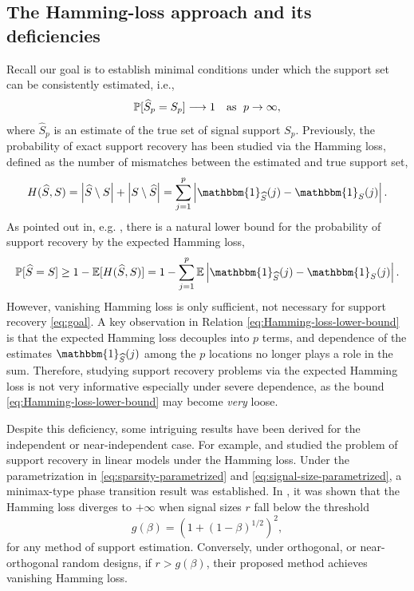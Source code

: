 \subsection{The Hamming-loss approach and its deficiencies}
Recall our goal is to establish minimal conditions under which the support set can be consistently estimated, i.e.,
\begin{equation} \label{eq:goal}
    \P[\widehat{S}_p = S_p] \longrightarrow 1 \quad \text{as } \; p\to\infty, 
\end{equation}
where $\widehat{S}_p$ is an estimate of the true set of signal support $S_p$.
Previously, the probability of exact support recovery has been studied via the Hamming loss, defined as the number of mismatches between the estimated and true support set,
\begin{equation} \label{eq:Hamming-loss}
    H(\widehat S, S)
    = \left|\widehat S \setminus S\right| + \left|S \setminus \widehat S\right|
    = \sum\limits_{j=1}^p\left|\mathbbm{1}_{\widehat{S}}(j)- \mathbbm{1}_{S}(j)\right|.
\end{equation}
As pointed out in, e.g. \citet{butucea2018variable}, there is a natural lower bound for the probability of support recovery by the expected Hamming loss,
\begin{equation} \label{eq:Hamming-loss-lower-bound}
    \mathbb{P}[\widehat S = S] 
    \ge 1 - \mathbb{E}[H(\widehat S, S)]
    = 1 - \sum\limits_{j=1}^p\E\left|\mathbbm{1}_{\widehat{S}}(j)- \mathbbm{1}_{S}(j)\right|.
\end{equation}
However, vanishing Hamming loss is only sufficient, not necessary for support recovery \eqref{eq:goal}.
A key observation in Relation \eqref{eq:Hamming-loss-lower-bound} is that the expected Hamming loss decouples into $p$ terms, and dependence of the estimates $\mathbbm{1}_{\widehat{S}}(j)$ among the $p$ locations no longer plays a role in the sum.
Therefore, studying support recovery problems via the expected Hamming loss is not very informative especially under severe dependence, as the bound \eqref{eq:Hamming-loss-lower-bound} may become \emph{very} loose.

Despite this deficiency, some intriguing results have been derived for the independent or near-independent case.
For example, \citet{genovese2012comparison} and \citet{ji2012ups} studied the problem of support recovery in linear models under the Hamming loss.
Under the parametrization in \eqref{eq:sparsity-parametrized} and \eqref{eq:signal-size-parametrized}, a minimax-type phase transition result was established. In \citep{ji2012ups}, it was shown that the  Hamming loss diverges to $+\infty$ when signal sizes $r$ fall below the threshold
\begin{equation} \label{eq:strong-classification-boundary-Gaussian}
    g(\beta) = (1 + (1 - \beta)^{1/2})^2,
\end{equation}
for any method of support estimation.
Conversely, under orthogonal, or near-orthogonal random designs, if $r>g(\beta)$, their proposed method achieves vanishing Hamming loss.

